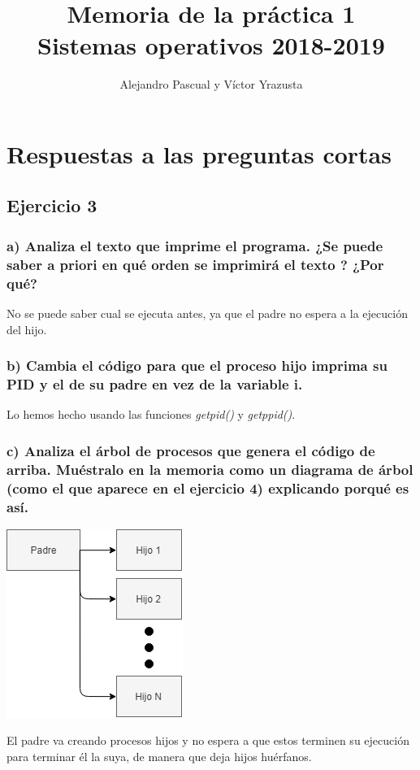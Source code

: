 \documentclass[]{article}
\title{Memoria de la práctica 1 \\
	\Large Sistemas operativos 2018-2019}
\author{Alejandro Pascual y V\'ictor Yrazusta}
\begin{document}
\maketitle

\section*{Respuestas a las preguntas cortas}
\subsection*{Ejercicio 3}
\subsubsection*{a) Analiza el texto que imprime el programa. ¿Se puede saber a priori en qué orden se imprimirá el texto ? ¿Por qué?}
No se puede saber cual se ejecuta antes,
ya que el padre no espera a la ejecución del hijo.

\subsubsection*{b) Cambia el código para que el proceso hijo imprima su PID y el de su padre en vez de la variable i.}
Lo hemos hecho usando las funciones \textit{getpid()} y \textit{getppid()}.

\subsubsection*{c) Analiza el árbol de procesos que genera el código de arriba. Muéstralo en la memoria como un diagrama de árbol (como el que aparece en el ejercicio 4) explicando porqué es así.}
\begin{center}
\includegraphics[scale=0.75]{3c.png}
\end{center}
El padre va creando procesos hijos y no espera a que estos terminen su ejecución para terminar él la suya, de manera que deja hijos huérfanos. 
\end{document}
